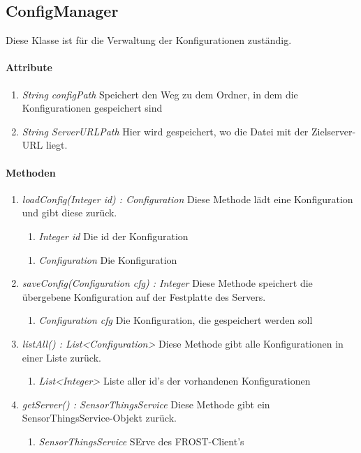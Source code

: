 
\subsection{ConfigManager}
Diese Klasse ist für die Verwaltung der Konfigurationen zuständig.
\paragraph{Attribute}
\begin{enumerate}[-]
	\item \textit{String configPath} Speichert den Weg zu dem Ordner, in dem die Konfigurationen gespeichert sind
	
	\item \textit{String ServerURLPath} Hier wird gespeichert, wo die Datei mit der Zielserver-URL liegt.		
\end{enumerate}

\paragraph{Methoden}
	
	\begin{enumerate}[+]
	\item \textit{loadConfig(Integer id) : Configuration} Diese Methode lädt eine Konfiguration und gibt diese zurück.
		\begin{enumerate}[$\bullet$]
			\item \textit{Integer id} Die id der Konfiguration
		\end{enumerate}
		\vspace{-0.2cm}
		\begin{enumerate}[$\circ$]
			\item \textit{Configuration} Die Konfiguration
		\end{enumerate}
	
	\item \textit{saveConfig(Configuration cfg) : Integer} Diese Methode speichert die übergebene Konfiguration auf der Festplatte des Servers.
	
	\begin{enumerate}[$\bullet$]
		\item \textit{Configuration cfg} Die Konfiguration, die gespeichert werden soll
	\end{enumerate}
	
	\item \textit{listAll() : List<Configuration> } Diese Methode gibt alle Konfigurationen in einer Liste zurück.
	
	\begin{enumerate}[$\circ$]
		\item \textit{List<Integer>} Liste aller id's der vorhandenen Konfigurationen
	\end{enumerate}
	
	\item \textit{getServer() : SensorThingsService} Diese Methode gibt ein SensorThingsService-Objekt zurück.
	
	\begin{enumerate}[$\circ$]
		\item \textit{SensorThingsService} SErve des FROST-Client's
	\end{enumerate}
\end{enumerate}